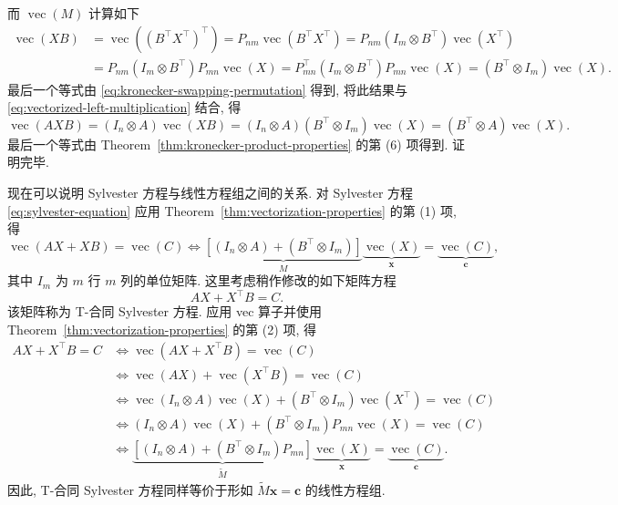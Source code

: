 \begin{Proof}
\begin{equation}
\end{equation}
{而 $\operatorname{vec}(M)$ 计算如下}
\[\begin{aligned}
\operatorname{vec}(XB)&=\operatorname{vec}((B^{\top}X^{\top})^{\top})=P_{nm}\operatorname{vec}(B^{\top}X^{\top})=P_{nm}(I_m\otimes B^{\top})\operatorname{vec}(X^{\top})\\
&=P_{nm}(I_m\otimes B^{\top})P_{mn}\operatorname{vec}(X)
=P_{mn}^{\top}(I_m\otimes B^{\top})P_{mn}\operatorname{vec}(X)=(B^{\top}\otimes I_m)\operatorname{vec}(X).
\end{aligned}\]
{最后一个等式由 \eqref{eq:kronecker-swapping-permutation} 得到, 将此结果与 \eqref{eq:vectorized-left-multiplication} 结合, 得}
\[\operatorname{vec}(AXB)=(I_n\otimes A)\operatorname{vec}(XB)=(I_n\otimes A)(B^{\top}\otimes I_m)\operatorname{vec}(X)=(B^{\top}\otimes A)\operatorname{vec}(X).\]
{最后一个等式由 Theorem\ \ref{thm:kronecker-product-properties} 的第 (6) 项得到. 证明完毕.}
\end{Proof}
{\leavevmode{}\label{idx:chapter-02-section-04:sylvester-linear-system}现在可以说明 Sylvester 方程与线性方程组之间的关系. 对 Sylvester 方程 \eqref{eq:sylvester-equation} 应用 Theorem\ \ref{thm:vectorization-properties} 的第 (1) 项, 得}
\[\operatorname{vec}(AX+XB)=\operatorname{vec}(C)\Leftrightarrow
\underbrace{[(I_n\otimes A)+(B^{\top}\otimes I_m)]}_M
\underbrace{\operatorname{vec}(X)}_{\boldsymbol{x}}=\underbrace{\operatorname{vec}(C)}_{\boldsymbol{c}},\]
{其中 $I_m$ 为 $m$ 行 $m$ 列的单位矩阵. 这里考虑稍作修改的如下矩阵方程}
\[AX+X^{\top}B=C.\]
{该矩阵称为 T-合同 Sylvester 方程. 应用 vec 算子并使用 Theorem\ \ref{thm:vectorization-properties} 的第 (2) 项, 得}
\[\begin{aligned}
AX+X^{\top}B=C&\Leftrightarrow\operatorname{vec}(AX+X^{\top}B)=\operatorname{vec}(C)\\
&\Leftrightarrow\operatorname{vec}(AX)+\operatorname{vec}(X^{\top}B)=\operatorname{vec}(C)\\
&\Leftrightarrow\operatorname{vec}(I_n\otimes A)\operatorname{vec}(X)+(B^{\top}\otimes I_m)\operatorname{vec}(X^{\top})=\operatorname{vec}(C)\\
&\Leftrightarrow(I_n\otimes A)\operatorname{vec}(X)+(B^{\top}\otimes I_m)P_{mn}\operatorname{vec}(X)=\operatorname{vec}(C)\\
&\Leftrightarrow\underbrace{[(I_n\otimes A)+(B^{\top}\otimes I_m)P_{mn}]}_{\widetilde M}\underbrace{\operatorname{vec}(X)}_{\boldsymbol{x}}=\underbrace{\operatorname{vec}(C)}_{\boldsymbol{c}}.
\end{aligned}\]
{因此, T-合同 Sylvester 方程同样等价于形如 $\widetilde M\boldsymbol{x}=\boldsymbol{c}$ 的线性方程组.}
